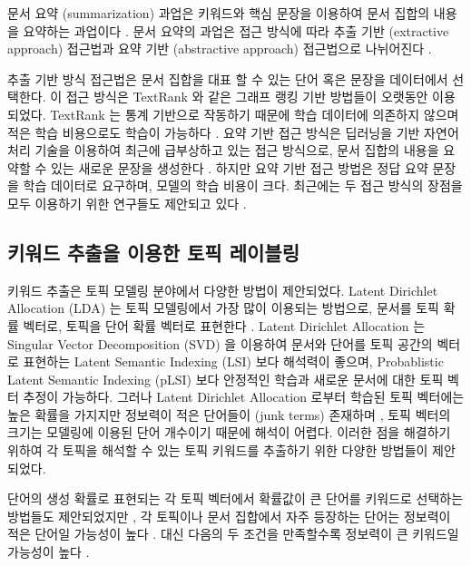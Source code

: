 \documentclass[oneside, ko,phd]{snuthesis_utf8_kor}
\begin{document}
문서 요약 (summarization) 과업은 키워드와 핵심 문장을 이용하여 문서 집합의 내용을 요약하는 과업이다 \cite{yao2017recent}.
문서 요약의 과업은 접근 방식에 따라 추출 기반 (extractive approach) 접근법과 요약 기반 (abstractive approach) 접근법으로 나뉘어진다 \cite{yao2017recent}.

추출 기반 방식 접근법은 문서 집합을 대표 할 수 있는 단어 혹은 문장을 데이터에서 선택한다.
이 접근 방식은 TextRank \cite{mihalcea2004textrank} 와 같은 그래프 랭킹 기반 방법들이 오랫동안 이용되었다.
TextRank 는 통계 기반으로 작동하기 때문에 학습 데이터에 의존하지 않으며 적은 학습 비용으로도 학습이 가능하다 \cite{parveen2015topical, narayan2018ranking}.
요약 기반 접근 방식은 딥러닝을 기반 자연어처리 기술을 이용하여 최근에 급부상하고 있는 접근 방식으로, 문서 집합의 내용을 요약할 수 있는 새로운 문장을 생성한다 \cite{nallapati2016abstractive}.
하지만 요약 기반 접근 방법은 정답 요약 문장을 학습 데이터로 요구하며, 모델의 학습 비용이 크다.
최근에는 두 접근 방식의 장점을 모두 이용하기 위한 연구들도 제안되고 있다 \cite{banerjee2015multi, bing2015abstractive, gu2016incorporating}.


\subsection{키워드 추출을 이용한 토픽 레이블링}

키워드 추출은 토픽 모델링 분야에서 다양한 방법이 제안되었다.
Latent Dirichlet Allocation (LDA) 는 토픽 모델링에서 가장 많이 이용되는 방법으로, 문서를 토픽 확률 벡터로, 토픽을 단어 확률 벡터로 표현한다 \cite{blei2003latent}.
Latent Dirichlet Allocation 는 Singular Vector Decomposition (SVD) 을 이용하여 문서와 단어를 토픽 공간의 벡터로 표현하는 Latent Semantic Indexing (LSI) \cite{landauer1998introduction} 보다 해석력이 좋으며, Probablistic Latent Semantic Indexing (pLSI) \cite{hofmann1999probabilistic} 보다 안정적인 학습과 새로운 문서에 대한 토픽 벡터 추정이 가능하다. 그러나 Latent Dirichlet Allocation 로부터 학습된 토픽 벡터에는 높은 확률을 가지지만 정보력이 적은 단어들이 (junk terms) 존재하며 \cite{newman2010evaluating}, 토픽 벡터의 크기는 모델링에 이용된 단어 개수이기 때문에 해석이 어렵다.
이러한 점을 해결하기 위하여 각 토픽을 해석할 수 있는 토픽 키워드를 추출하기 위한 다양한 방법들이 제안되었다. 

단어의 생성 확률로 표현되는 각 토픽 벡터에서 확률값이 큰 단어를 키워드로 선택하는 방법들도 제안되었지만 \cite{snyder2013topic, chuang2013topic, wallach2009evaluation}, 각 토픽이나 문서 집합에서 자주 등장하는 단어는 정보력이 적은 단어일 가능성이 높다 \cite{ramage09tmsocial, newman2010evaluating, chuang2012interpretation}.
대신 다음의 두 조건을 만족할수록 정보력이 큰 키워드일 가능성이 높다 \cite{chuang2012termite}.
\end{document}
